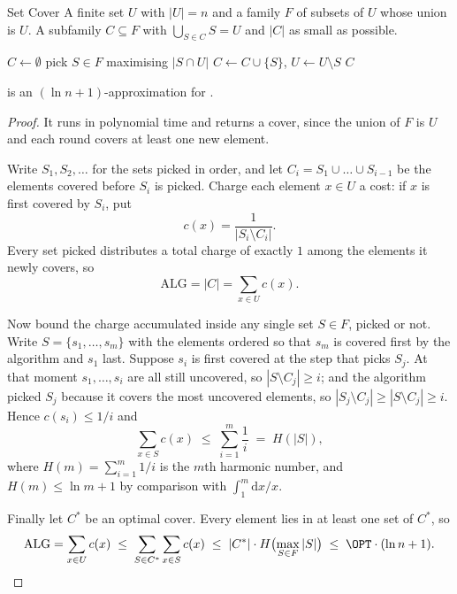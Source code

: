 \begin{probdef}{Set Cover}
  \instance A finite set $U$ with $|U| = n$ and a family $F$ of subsets of $U$
  whose union is $U$.
  \question A subfamily $C \subseteq F$ with $\bigcup_{S \in C} S = U$ and
  $|C|$ as small as possible.
\end{probdef}

\begin{algorithm}[ht]
\caption{Greedy }
\label{alg:greedy-set-cover}
\begin{algorithmic}[1]
  \State $C \gets \emptyset$
    \State pick $S \in F$ maximising $|S \cap U|$
    \State $C \gets C \cup \{S\}$, \quad $U \gets U \setminus S$
  \EndWhile
  \State \Return $C$
\end{algorithmic}
\end{algorithm}

\begin{theorem}\label{thm:greedy-set-cover}
 is an $(\ln n + 1)$-approximation for
.
\end{theorem}

\begin{proof}
It runs in polynomial time and returns a cover, since the union of $F$ is $U$
and each round covers at least one new element.

Write $S_1, S_2, \dots$ for the sets picked in order, and let
$C_i = S_1 \cup \dots \cup S_{i-1}$ be the elements covered before $S_i$ is
picked. Charge each element $x \in U$ a cost: if $x$ is first covered by $S_i$,
put
\[ c(x) = \frac{1}{|S_i \setminus C_i|}. \]
Every set picked distributes a total charge of exactly $1$ among the elements it
newly covers, so
\[ \mathrm{ALG} = |C| = \sum_{x \in U} c(x). \]

Now bound the charge accumulated inside any single set $S \in F$, picked or not.
Write $S = \{s_1, \dots, s_m\}$ with the elements ordered so that $s_m$ is
covered first by the algorithm and $s_1$ last. Suppose $s_i$ is first covered at
the step that picks $S_j$. At that moment $s_1, \dots, s_i$ are all still
uncovered, so $|S \setminus C_j| \ge i$; and the algorithm picked $S_j$ because
it covers the most uncovered elements, so
$|S_j \setminus C_j| \ge |S \setminus C_j| \ge i$. Hence $c(s_i) \le 1/i$ and
\[ \sum_{x \in S} c(x) \;\le\; \sum_{i=1}^{m} \frac{1}{i} \;=\; H(|S|), \]
where $H(m) = \sum_{i=1}^m 1/i$ is the $m$th harmonic number, and
$H(m) \le \ln m + 1$ by comparison with $\int_1^m \mathrm{d}x/x$.

Finally let $C^{*}$ be an optimal cover. Every element lies in at least one set
of $C^{*}$, so
\[ \mathrm{ALG} = \sum_{x \in U} c(x)
   \;\le\; \sum_{S \in C^{*}} \sum_{x \in S} c(x)
   \;\le\; |C^{*}| \cdot H\bigl(\max_{S \in F} |S|\bigr)
   \;\le\; \OPT \cdot (\ln n + 1). \qedhere \]
\end{proof}

